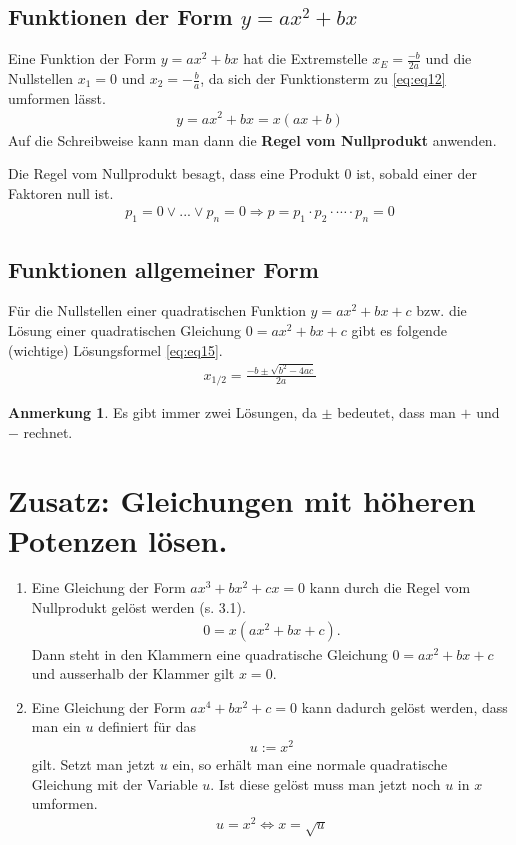 \documentclass{report}
\newcommand{\x}{\cdot}
\newcommand{\abc}{\frac{-b \pm \sqrt{b^2-4ac}}{2a}}
\theoremstyle{definition}
\theoremstyle{definition}
\theoremstyle{an}
\newtheorem{anm}{Anmerkung}[section]
\theoremstyle{lem}
\theoremstyle{def}
\theoremstyle{def}
\begin{document}
	\subsection{Funktionen der Form $y=ax^2+bx$}
	Eine Funktion der Form $y=ax^2+bx$ hat die Extremstelle $x_E=\frac{-b}{2a}$ und die Nullstellen $x_1=0$ und $x_2=-\frac ba$, da sich der Funktionsterm zu \eqref{eq:eq12} umformen lässt.
	\begin{align}
		y=ax^2+bx=x(ax+b) \label{eq:eq12}
	\end{align}
	Auf die Schreibweise kann man dann die \textbf{Regel vom Nullprodukt} anwenden.
	\begin{defi}
		Die Regel vom Nullprodukt besagt, dass eine Produkt 0 ist, sobald einer der Faktoren null ist.
		\begin{align*}
			p_1=0\lor...\lor p_n=0 \Rightarrow  p=p_1 \x p_2 \x \cdots \x p_n=0 
		\end{align*}
	\end{defi}
	\subsection{Funktionen allgemeiner Form}
	\begin{defi}[Mitternachtsformel]
		Für die Nullstellen einer quadratischen Funktion $y=ax^2+bx+c$ bzw. die Lösung einer quadratischen Gleichung $0=ax^2+bx+c$ gibt es folgende (wichtige) Lösungsformel \eqref{eq:eq15}.
	\begin{align}
		x_{1/2}=\abc \label{eq:eq15}
	\end{align}
	\end{defi}
	\begin{anm}
		 Es gibt immer zwei Lösungen, da $\pm$ bedeutet, dass man $+$ und $-$ rechnet.
	\end{anm} 
	\pagebreak
	\section{Zusatz: Gleichungen mit höheren Potenzen lösen.}
	\begin{defi}
	\begin{enumerate}
			\item Eine Gleichung der Form $ax^3+bx^2+cx=0$ kann durch die Regel vom Nullprodukt gelöst werden (s. 3.1).
		\begin{align}
			0=x(ax^2+bx+c).
		\end{align}
		Dann steht in den Klammern eine quadratische Gleichung $0=ax^2+bx+c$ und ausserhalb der Klammer gilt $x=0$.
		\item Eine Gleichung der Form $ax^4+bx^2+c=0$ kann dadurch gelöst werden, dass man ein $u$ definiert für das 
		\begin{align}
			u:=x^2
		\end{align}
		gilt. Setzt man jetzt $u$ ein, so erhält man eine normale quadratische Gleichung mit der Variable $u$. Ist diese gelöst muss man jetzt noch $u$ in $x$ umformen.
		\begin{align}
			u=x^2\Leftrightarrow x=\sqrt u
		\end{align}
	\end{enumerate}
		\end{defi}
	
\end{document}
